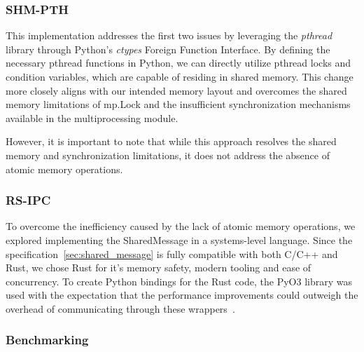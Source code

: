 \documentclass[conference]{IEEEtran}
\begin{document}
\subsubsection{\textbf{SHM-PTH}}
This implementation addresses the first two issues by leveraging the \textit{pthread} library through Python’s \textit{ctypes} Foreign Function Interface.
By defining the necessary pthread functions in Python, we can directly utilize pthread locks and condition variables, which are capable of residing in shared memory.
This change more closely aligns with our intended memory layout and overcomes the shared memory limitations of mp.Lock and the insufficient synchronization mechanisms available in the multiprocessing module.

However, it is important to note that while this approach resolves the shared memory and synchronization limitations, it does not address the absence of atomic memory operations.

\subsubsection{\textbf{RS-IPC}}

To overcome the inefficiency caused by the lack of atomic memory operations, we explored implementing the SharedMessage in a systems-level language.
Since the specification~\ref{sec:shared_message} is fully compatible with both C/C++ and Rust, we chose Rust for it's memory safety, modern tooling and ease of concurrency.
To create Python bindings for the Rust code, the PyO3 library was used with the expectation that the performance improvements could outweigh the overhead of communicating through these wrappers~\cite{pyO3}.

\subsubsection{\textbf{Benchmarking}}
\end{document}
